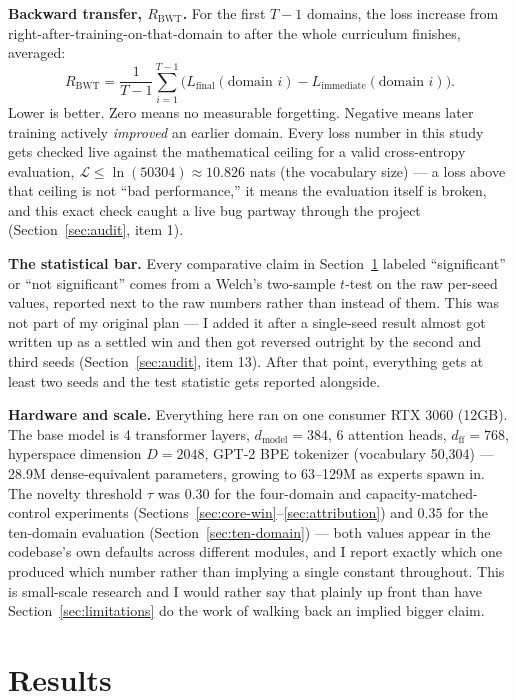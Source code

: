 \documentclass[11pt,letterpaper]{article}
\begin{document}
\textbf{Backward transfer, $R_{\text{BWT}}$.} For the first $T-1$ domains, the loss increase from right-after-training-on-that-domain to after the whole curriculum finishes, averaged:
\begin{equation}
R_{\text{BWT}} = \frac{1}{T-1} \sum_{i=1}^{T-1} \Big( L_{\text{final}}(\text{domain } i) - L_{\text{immediate}}(\text{domain } i) \Big).
\end{equation}
Lower is better. Zero means no measurable forgetting. Negative means later training actively \emph{improved} an earlier domain. Every loss number in this study gets checked live against the mathematical ceiling for a valid cross-entropy evaluation, $\mathcal{L} \le \ln(50304) \approx 10.826$ nats (the vocabulary size) --- a loss above that ceiling is not ``bad performance,'' it means the evaluation itself is broken, and this exact check caught a live bug partway through the project (Section~\ref{sec:audit}, item 1).

\textbf{The statistical bar.} Every comparative claim in Section~\ref{sec:results} labeled ``significant'' or ``not significant'' comes from a Welch's two-sample $t$-test on the raw per-seed values, reported next to the raw numbers rather than instead of them. This was not part of my original plan --- I added it after a single-seed result almost got written up as a settled win and then got reversed outright by the second and third seeds (Section~\ref{sec:audit}, item 13). After that point, everything gets at least two seeds and the test statistic gets reported alongside.

\textbf{Hardware and scale.} Everything here ran on one consumer RTX 3060 (12GB). The base model is 4 transformer layers, $d_{\text{model}}=384$, 6 attention heads, $d_{\text{ff}}=768$, hyperspace dimension $D=2048$, GPT-2 BPE tokenizer (vocabulary 50{,}304) --- 28.9M dense-equivalent parameters, growing to 63--129M as experts spawn in. The novelty threshold $\tau$ was $0.30$ for the four-domain and capacity-matched-control experiments (Sections~\ref{sec:core-win}--\ref{sec:attribution}) and $0.35$ for the ten-domain evaluation (Section~\ref{sec:ten-domain}) --- both values appear in the codebase's own defaults across different modules, and I report exactly which one produced which number rather than implying a single constant throughout. This is small-scale research and I would rather say that plainly up front than have Section~\ref{sec:limitations} do the work of walking back an implied bigger claim.

\section{Results}
\label{sec:results}
\end{document}
